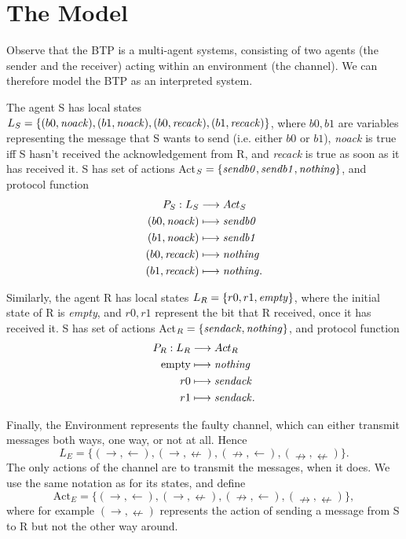 \documentclass[11pt]{report}
\begin{document}
\section{The Model}

Observe that the BTP is a multi-agent systems, consisting of two agents (the sender and the receiver) acting within an environment (the channel).
We can therefore model the BTP as an interpreted system. 


The agent S has local states $L_S = \{(b0, \mbox{\textit{noack}}), (b1, \mbox{\textit{noack}}), (b0, \mbox{\textit{recack}}), (b1, \mbox{\textit{recack}})\}$, where $b0, b1$ are variables representing the message that S wants to send (i.e. either $b0$ or $b1$), \textit{noack} is true iff S hasn't received the acknowledgement from R, and \textit{recack} is true as soon as it has received it. S has set of actions Act$_S = \{\mbox{\textit{sendb0}}, \mbox{\textit{sendb1}}, \mbox{\textit{nothing}}\}$, and protocol function 
\begin{align*}
P_S: L_S &\longrightarrow Act_S \\
	 (b0, \mbox{\textit{noack}}) &\longmapsto \mbox{\textit{sendb0}} \\
	 (b1, \mbox{\textit{noack}}) &\longmapsto \mbox{\textit{sendb1}} \\
	 (b0, \mbox{\textit{recack}}) &\longmapsto \mbox{\textit{nothing}} \\
	 (b1, \mbox{\textit{recack}}) &\longmapsto \mbox{\textit{nothing}}.
\end{align*}

Similarly, the agent R has local states $L_R = \{r0, r1, \mbox{\textit{empty}}\}$, where the initial state of R is \textit{empty}, and $r0, r1$ represent the bit that R received, once it has received it. S has set of actions Act$_R = \{\mbox{\textit{sendack}}, \mbox{\textit{nothing}}\}$, and protocol function 
\begin{align*}
P_R: L_R &\longrightarrow Act_R \\
     \mbox{empty} &\longmapsto \mbox{\textit{nothing}} \\
	 r0 &\longmapsto \mbox{\textit{sendack}} \\
	 r1 &\longmapsto \mbox{\textit{sendack}}.
\end{align*}

Finally, the Environment represents the faulty channel, which can either transmit messages both ways, one way, or not at all. Hence $$L_E = \{(\rightarrow, \leftarrow), (\rightarrow, \nleftarrow), (\nrightarrow, \leftarrow), (\nrightarrow, \nleftarrow)\}.$$
The only actions of the channel are to transmit the messages, when it does. We use the same notation as for its states, and define $$\mbox{Act}_E = \{(\rightarrow, \leftarrow), (\rightarrow, \nleftarrow), (\nrightarrow, \leftarrow), (\nrightarrow, \nleftarrow)\}, $$ where for example $(\rightarrow, \nleftarrow)$ represents the action of sending a message from S to R but not the other way around.
\end{document}
